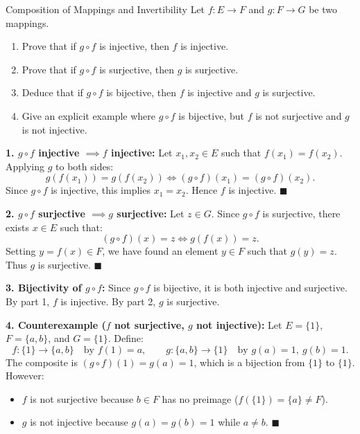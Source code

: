 \begin{exercise}{Composition of Mappings and Invertibility}
Let $f: E \to F$ and $g: F \to G$ be two mappings.
\begin{enumerate}[leftmargin=1.5em,itemsep=2pt]
  \item Prove that if $g \circ f$ is injective, then $f$ is injective.
  \item Prove that if $g \circ f$ is surjective, then $g$ is surjective.
  \item Deduce that if $g \circ f$ is bijective, then $f$ is injective and $g$ is surjective.
  \item Give an explicit example where $g \circ f$ is bijective, but $f$ is not surjective and $g$ is not injective.
\end{enumerate}
\end{exercise}

\begin{tabletworkspace}[5.0cm]
\end{tabletworkspace}

\begin{solution}
\textbf{1. $g \circ f$ injective $\implies f$ injective:}
Let $x_1, x_2 \in E$ such that $f(x_1) = f(x_2)$.
Applying $g$ to both sides:
\[
g(f(x_1)) = g(f(x_2)) \iff (g \circ f)(x_1) = (g \circ f)(x_2).
\]
Since $g \circ f$ is injective, this implies $x_1 = x_2$. Hence $f$ is injective. \hfill $\blacksquare$

\textbf{2. $g \circ f$ surjective $\implies g$ surjective:}
Let $z \in G$. Since $g \circ f$ is surjective, there exists $x \in E$ such that:
\[
(g \circ f)(x) = z \iff g(f(x)) = z.
\]
Setting $y = f(x) \in F$, we have found an element $y \in F$ such that $g(y) = z$.
Thus $g$ is surjective. \hfill $\blacksquare$

\textbf{3. Bijectivity of $g \circ f$:}
Since $g \circ f$ is bijective, it is both injective and surjective.
By part 1, $f$ is injective. By part 2, $g$ is surjective.

\textbf{4. Counterexample ($f$ not surjective, $g$ not injective):}
Let $E = \{1\}$, $F = \{a, b\}$, and $G = \{1\}$.
Define:
\[
f: \{1\} \to \{a, b\} \quad \text{by } f(1) = a, \qquad g: \{a, b\} \to \{1\} \quad \text{by } g(a) = 1,\ g(b) = 1.
\]
The composite is $(g \circ f)(1) = g(a) = 1$, which is a bijection from $\{1\}$ to $\{1\}$.
However:
\begin{itemize}[leftmargin=1.5em,itemsep=1pt]
  \item $f$ is not surjective because $b \in F$ has no preimage ($f(\{1\}) = \{a\} \ne F$).
  \item $g$ is not injective because $g(a) = g(b) = 1$ while $a \ne b$. \hfill $\blacksquare$
\end{itemize}
\end{solution}

